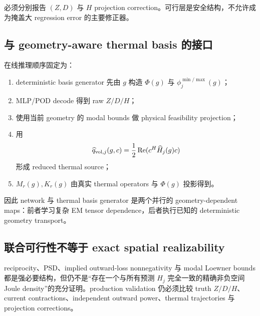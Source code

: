 必须分别报告 $(Z,D)$ 与 $H$ projection correction。可行层是安全结构，不允许成为掩盖大 regression error 的主要修正器。

\subsection{与 geometry-aware thermal basis 的接口}
在线推理顺序固定为：
\begin{enumerate}
  \item deterministic basis generator 先由 $g$ 构造 $\Phi(g)$ 与 $\phi_j^{\min/\max}(g)$；
  \item MLP/POD decode 得到 raw $Z/D/H$；
  \item 使用当前 geometry 的 modal bounds 做 physical feasibility projection；
  \item 用
  \begin{equation}
  \widehat q_{{\rm vol},j}(g,c)
  =\frac12\operatorname{Re}(c^H\widehat H_j(g)c)
  \end{equation}
  形成 reduced thermal source；
  \item $M_r(g),K_r(g)$ 由真实 thermal operators 与 $\Phi(g)$ 投影得到。
\end{enumerate}
因此 network 与 thermal basis generator 是两个并行的 geometry-dependent maps：前者学习复杂 EM tensor dependence，后者执行已知的 deterministic geometry transport。

\subsection{联合可行性不等于 exact spatial realizability}
reciprocity、PSD、implied outward-loss nonnegativity 与 modal Loewner bounds 都是强必要结构，但仍不是“存在一个与所有预测 $H_j$ 完全一致的精确非负空间 Joule density”的充分证明。production validation 仍必须比较 truth $Z/D/H$、current contractions、independent outward power、thermal trajectories 与 projection corrections。
